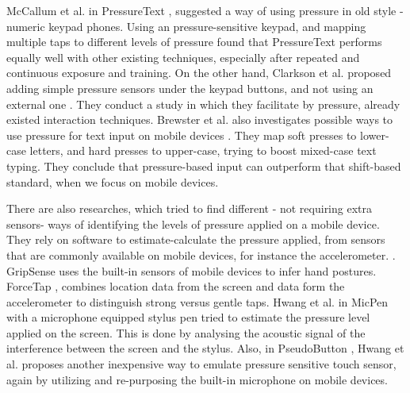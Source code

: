 McCallum et al. in PressureText \cite{McCallum:2009:PPI:1520340.1520693}, suggested a way of using pressure in old style - numeric keypad phones. Using an pressure-sensitive keypad, and mapping multiple taps to different levels of pressure found that PressureText performs equally well with other existing techniques, especially after repeated and continuous exposure and training. On the other hand, Clarkson et al. proposed adding simple pressure sensors under the keypad buttons, and not using an external one \cite{ClarksonGVU}. They conduct a study in which they facilitate by pressure, already existed interaction techniques. 
Brewster et al. also investigates possible ways to use pressure for text input on mobile devices \cite{Brewster:2009:PTE:1613858.1613870}. They map soft presses to lower-case letters, and hard presses to upper-case, trying to boost mixed-case text typing. They conclude that pressure-based input can outperform that shift-based standard, when we focus on mobile devices.

There are also researches, which tried to find different - not requiring extra sensors- ways of identifying the levels of pressure applied on a mobile device. They rely on software to estimate-calculate the pressure applied, from sensors that are commonly available on mobile devices, for instance the accelerometer. \cite{Goel:2012:GUB:2380116.2380184,Heo:2011:FEI:2037373.2037393,Hwang:2012:MPP:2212776.2223717,Hwang:2012:PEP:2212776.2223673}. GripSense \cite{Goel:2012:GUB:2380116.2380184} uses the built-in sensors of mobile devices to infer hand postures.
 ForceTap \cite{Heo:2011:FEI:2037373.2037393}, combines location data from the screen and data form the accelerometer to distinguish strong versus gentle taps. Hwang et al. in MicPen \cite{Hwang:2012:MPP:2212776.2223717} with a microphone equipped stylus pen tried to estimate the pressure level applied on the screen. This is done by analysing the acoustic signal of the interference between the screen and the stylus. Also, in PseudoButton \cite{Hwang:2012:PEP:2212776.2223673}, Hwang et al. proposes another inexpensive way to emulate pressure sensitive touch sensor, again by utilizing and re-purposing the built-in microphone on mobile devices.


